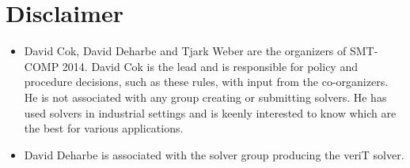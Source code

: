 \documentclass[12pt]{article}
\begin{document}
\section{Disclaimer}
\begin{itemize}
\item David Cok, David Deharbe and Tjark Weber are the organizers of SMT-COMP 2014. 
David Cok is the lead and is 
responsible for policy and procedure decisions, such as these
rules, with input from the co-organizers. He is not associated 
with any group creating or submitting solvers. He has used solvers
in industrial settings and is keenly interested to know which are the best for various applications.

\item David Deharbe is associated with the solver group producing the veriT solver.
\end{itemize}


\end{document}
